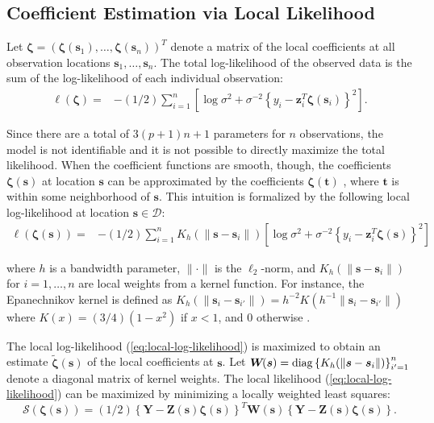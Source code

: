 \documentclass[authoryear,review, 12pt]{elsarticle}
\begin{document}
\subsection{Coefficient Estimation via Local Likelihood}

Let $\bm{\zeta}=\left(\bm{\zeta}(\bm{s}_{1}),\dots,\bm{\zeta}(\bm{s}_{n})\right)^{T}$
denote a matrix of the local coefficients at all observation locations
$\bm{s}_{1},\dots,\bm{s}_{n}$. The total log-likelihood of the observed
data is the sum of the log-likelihood of each individual observation:
\begin{align}
\ell\left(\bm{\zeta}\right)= & -(1/2)\sum_{i=1}^{n}\left[\log{\sigma^{2}}+\sigma^{-2}\left\{ y_{i}-\bm{z}_{i}^{T}\bm{\zeta}(\bm{s}_{i})\right\} ^{2}\right].\label{eq:coefficients}
\end{align}

Since there are a total of $3(p+1)n+1$ parameters for $n$ observations,
the model is not identifiable and it is not possible to directly maximize
the total likelihood. When the coefficient functions are smooth, though,
the coefficients $\bm{\zeta}(\bm{s})$ at location $\bm{s}$ can be
approximated by the coefficients $\bm{\zeta}(\bm{t})$ , where $\bm{t}$
is within some neighborhood of $\bm{s}$. This intuition is formalized
by the following local log-likelihood at location $\bm{s}\in\mathcal{D}$:
\begin{align}
\ell\left(\bm{\zeta}(\bm{s})\right)= & -(1/2)\sum_{i=1}^{n}K_{h}(\|\bm{s}-\bm{s}_{i}\|)\left[\log\sigma^{2}+\sigma^{-2}\left\{ y_{i}-\bm{z}_{i}^{T}\bm{\zeta}(\bm{s})\right\} ^{2}\right]\label{eq:local-log-likelihood}
\end{align}

where $h$ is a bandwidth parameter, $\|\cdot\|$ is the $\ell_{2}$-norm,
and $K_{h}(\|\bm{s}-\bm{s}_{i}\|)$ for $i=1,\dots,n$ are local weights
from a kernel function. For instance, the Epanechnikov kernel is defined
as $K_{h}(\|\bm{s}_{i}-\bm{s}_{i'}\|)=h^{-2}K\left(h^{-1}\|\bm{s}_{i}-\bm{s}_{i'}\|\right)$
where $K(x)=(3/4)(1-x^{2})$ if $x<1$, and $0$ otherwise \citep{Samiuddin-el-Sayyad-1990}.

The local log-likelihood (\ref{eq:local-log-likelihood}) is maximized
to obtain an estimate $\tilde{\bm{\zeta}}(\bm{s})$ of the local coefficients
at $\bm{s}$. Let $\bm{W}\!(\bm{s})={\rm diag}\left\{ K_{h}(\|\bm{s}-\bm{s}_{i}\|)\right\} _{i'=1}^{n}$
denote a diagonal matrix of kernel weights. The local likelihood (\ref{eq:local-log-likelihood})
can be maximized by minimizing a locally weighted least squares: 
\begin{equation}
\mathcal{S}\left(\bm{\zeta}(\bm{s})\right)=(1/2)\left\{ \bm{Y}-\bm{Z}(\bm{s})\bm{\zeta}(\bm{s})\right\} ^{T}\bm{W}\!(\bm{s})\left\{ \bm{Y}-\bm{Z}(\bm{s})\bm{\zeta}(\bm{s})\right\} .\label{eq:local-sum-of-squares}
\end{equation}
\end{document}
